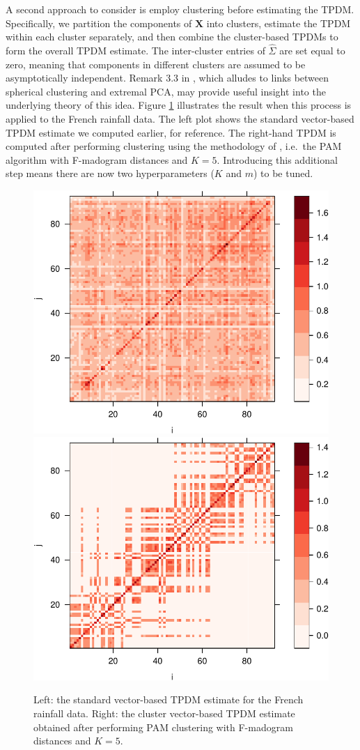 \documentclass[en-GB, a4paper, nobind]{templates/bathreport}
\begin{document}
A second approach to consider is employ clustering before estimating the TPDM. Specifically, we partition the components of \(\bm{X}\) into clusters, estimate the TPDM within each cluster separately, and then combine the cluster-based TPDMs to form the overall TPDM estimate. The inter-cluster entries of \(\hat{\Sigma}\) are set equal to zero, meaning that components in different clusters are assumed to be asymptotically independent. Remark 3.3 in \textcite{fomichovDetectionGroupsConcomitant2020}, which alludes to links between spherical clustering and extremal PCA, may provide useful insight into the underlying theory of this idea. Figure \ref{fig:fr-tpdm-clusters-levelplot} illustrates the result when this process is applied to the French rainfall data. The left plot shows the standard vector-based TPDM estimate we computed earlier, for reference. The right-hand TPDM is computed after performing clustering using the methodology of \textcite{bernardClusteringMaximaSpatial2013}, i.e.~the PAM algorithm with F-madogram distances and \(K=5\). Introducing this additional step means there are now two hyperparameters (\(K\) and \(m\)) to be tuned.

\begin{figure}

{\centering \includegraphics[width=0.48\linewidth]{figures/fr-tpdm-clusters-levelplot-1} \includegraphics[width=0.48\linewidth]{figures/fr-tpdm-clusters-levelplot-2} 

}

\caption[Example of a TPDM estimate obtained after clustering.]{Left: the standard vector-based TPDM estimate for the French rainfall data. Right: the cluster vector-based TPDM estimate obtained after performing PAM clustering with F-madogram distances and $K=5$.}\label{fig:fr-tpdm-clusters-levelplot}
\end{figure}
\end{document}
